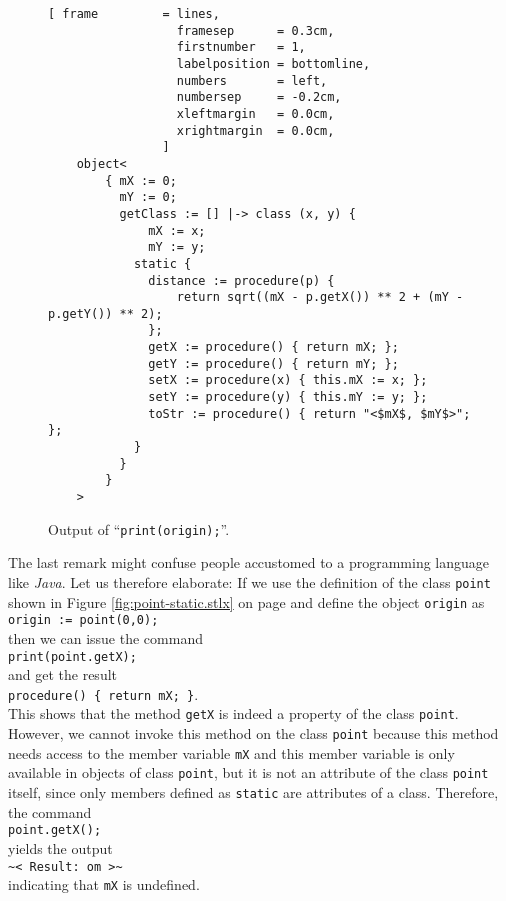 \begin{figure}[!ht]
\centering
\begin{Verbatim}[ frame         = lines, 
                  framesep      = 0.3cm, 
                  firstnumber   = 1,
                  labelposition = bottomline,
                  numbers       = left,
                  numbersep     = -0.2cm,
                  xleftmargin   = 0.0cm,
                  xrightmargin  = 0.0cm,
                ]
    object<
        { mX := 0; 
          mY := 0; 
          getClass := [] |-> class (x, y) { 
              mX := x; 
              mY := y; 
            static { 
              distance := procedure(p) { 
                  return sqrt((mX - p.getX()) ** 2 + (mY - p.getY()) ** 2); 
              }; 
              getX := procedure() { return mX; }; 
              getY := procedure() { return mY; }; 
              setX := procedure(x) { this.mX := x; }; 
              setY := procedure(y) { this.mY := y; }; 
              toStr := procedure() { return "<$mX$, $mY$>"; }; 
            } 
          }
        }
    >
\end{Verbatim}
\vspace*{-0.3cm}
\caption{Output of ``\texttt{print(origin);}''.}
\label{fig:point-static.stlx-origin}
\end{figure}

The last remark might confuse people accustomed to a programming language like \textsl{Java}.  Let
us therefore elaborate: If we use the definition of the class \texttt{point} shown in Figure
\ref{fig:point-static.stlx} on page \pageref{fig:point-static.stlx} and define the object
\texttt{origin} as
\\[0.2cm]
\hspace*{1.3cm}
\texttt{origin := point(0,0);}
\\[0.2cm]
then we can issue the command
\\[0.2cm]
\hspace*{1.3cm}
\texttt{print(point.getX);}
\\[0.2cm]
and get the result
\\[0.2cm]
\hspace*{1.3cm}
\texttt{procedure() \{ return mX; \}}.
\\[0.2cm]
This shows that the method \texttt{getX} is indeed a property of the class \texttt{point}.  However, 
we cannot invoke this method on the class \texttt{point} because this method needs access to the
member variable \texttt{mX} and this member variable is only available in objects of class
\texttt{point}, but it is not an attribute of the class \texttt{point} itself, since only members
defined as \texttt{static} are attributes of a class.  Therefore, the command
\\[0.2cm]
\hspace*{1.3cm}
\texttt{point.getX();}
\\[0.2cm]
yields the output
\\[0.2cm]
\hspace*{1.3cm}
\texttt{\~{}< Result: om >\~}
\\[0.2cm]
indicating that \texttt{mX} is undefined.  

